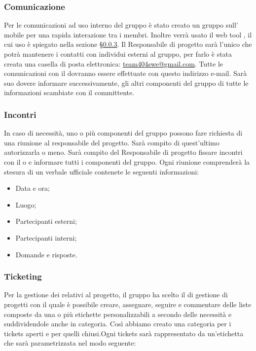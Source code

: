 \documentclass[a4paper,11pt]{article}
\begin{document}
				
		
		\subsubsection{Comunicazione}
			Per le comunicazioni ad uso interno del gruppo è stato creato un gruppo sull' mobile  per una rapida interazione tra i membri. Inoltre verrà usato il web tool , il cui uso è spiegato nella sezione §\ref{subsec:ticketing}.
			Il Responsabile di progetto sarà l'unico che potrà mantenere i contatti con individui esterni al gruppo, per farlo è stata creata una casella di posta elettronica: \url{team404swe@gmail.com}. Tutte le comunicazioni con il  dovranno essere effettuate con questo indirizzo e-mail. Sarà suo dovere informare successivamente, gli altri componenti del gruppo di tutte le informazioni scambiate con il committente.
		\subsubsection{Incontri}
		In caso di necessità, uno o più componenti del gruppo possono fare richiesta di una riunione al responsabile del progetto. Sarà compito di quest'ultimo autorizzarla o meno. 
		Sarà compito del Responsabile di progetto fissare incontri con il o  e informare tutti i componenti del gruppo. Ogni riunione comprenderà la stesura di un verbale ufficiale contenete le seguenti informazioni:
\begin{itemize}
\item Data e ora;
\item Luogo;
\item Partecipanti esterni;
\item Partecipanti interni;
\item Domande e risposte.
\end{itemize}
		
		\subsubsection{Ticketing} 	\label{subsec:ticketing}
		Per la gestione dei  relativi al progetto, il gruppo ha scelto il  di gestione di progetti  con il quale è possibile creare, assegnare, seguire e commentare delle liste composte
da una o più etichette personalizzabili a secondo delle necessità e suddividendole anche in categoria. Così abbiamo creato una categoria  per i tickets aperti e  per quelli chiusi.Ogni tickets sarà rappresentato da un'etichetta che sarà parametrizzata nel modo seguente:
\end{document}
